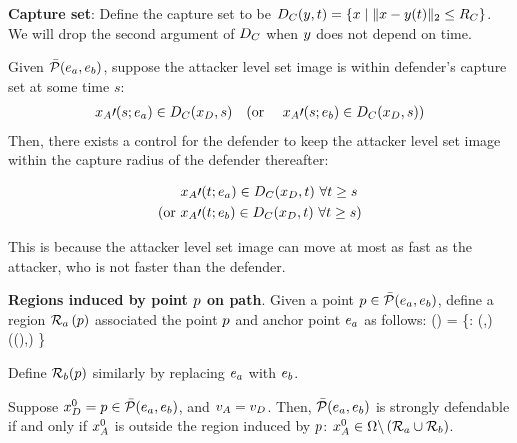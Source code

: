 \begin{defn} %
\textbf{Capture set}: Define the capture set to be $D_C(y,t)=\{x \mid \|x-y(t)\|_2\leq R_C\}$. We will drop the second argument of $D_C$ when $y$ does not depend on time.
\end{defn}

\begin{rem}
Given $\bar{\mathcal{P}}(e_a,e_b)$, suppose the attacker level set image is within defender's capture set at some time $s$: 
\begin{equation*}
\begin{aligned}
&x_A\prime(s;e_a) \in D_C(x_D, s) \quad \text{(or } & x_A\prime(s;e_b) \in D_C(x_D, s) \text{)}
\end{aligned}
\end{equation*}
Then, there exists a control for the defender to keep the attacker level set image within the capture radius of the defender thereafter: 

\begin{equation*}
\begin{aligned}
&x_A\prime(t;e_a) \in D_C(x_D, t) ~ \forall t\geq s \\
\text{(or } & x_A\prime(t;e_b) \in D_C(x_D, t) ~ \forall t\geq s\text{)}
\end{aligned}
\end{equation*}

This is because the attacker level set image can move at most as fast as the attacker, who is not faster than the defender.
\end{rem}

\begin{defn} %
\label{def:d_win_region}
\textbf{Regions induced by point $p$ on path}. Given a point $p\in\bar{\mathcal{P}}(e_a,e_b)$, define a region $\mathcal{R}_a\left(p\right)$ associated the point $p$ and anchor point $e_a$ as follows:
\bq
\rpa\left(\ppath\right) = \left\{\x: \dist(\x,\apa) \leq \dist(\Dc(\ppath),\apa) \right\}
\eq

Define $\mathcal{R}_b(p)$ similarly by replacing $e_a$ with $e_b$.
\end{defn}

\begin{lem}
\label{lem:d_winning_region}
Suppose $x_D^0 = p \in \bar{\mathcal{P}}(e_a,e_b)$, and $v_A=v_D$. Then, $\bar{\mathcal{P}}(e_a,e_b)$ is strongly defendable if and only if $x_A^0$ is outside the region induced by $p$: $x_A^0\in\Omega\backslash\left(\mathcal{R}_a \cup \mathcal{R}_b\right)$.
\end{lem}

